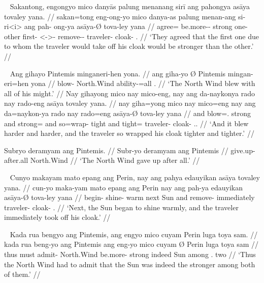 \ex~ %
\begingl
	\gla Sakantong, engongyo mico danyās palung menanang sirī ang pahongya
		asāya tovaley yana. //
	\glb sakan=tong eng-ong-yo mico danya-as palung menan-ang si-ri<i> ang pah-
		ong-ya asāya-Ø tova-ley yana //
	\glc agree=\TplN{} be.more-\Irr{}-\TsgN{} strong one-\Parg{} other
		first-\Aarg{} \Rel{}<-\Aarg{}>-\Caus{} \AgtT{}
		remove-\Irr{}-\TsgM{} traveler-\Top{} cloak-\PargI{}
		\TsgM{}.\Gen{} //
	\glft `They agreed that the first one due to whom the traveler would take
		off his cloak would be stronger than the other.' //
\endgl
\xe

\pex~ %
\a \begingl
	\gla Ang gihayo {} Pintemis minganeri-hen yona. //
	\glb ang giha-yo Ø Pintemis mingan-eri=hen yona //
	\glc \AgtT{} blow-\TsgN{} \Top{} North.Wind ability-\Ins{}=all
		\TsgN{}.\Gen{} //
	\glft `The North Wind blew with all of his might.' //
\endgl
\a \begingl
	\gla Nay gihayong mico nay mico-eng, nay ang da-naykonya rado nay rado-eng
		asāya tovaley yana. //
	\glb nay giha=yong mico nay mico=eng nay ang da=naykon-ya rado nay rado=eng
		asāya-Ø tova-ley yana //
	\glc and blow=\TsgN{}.\Aarg{} strong and strong=\Comp{} and \AgtT{}
		so=wrap-\TsgM{} tight and tight=\Comp{} traveler-\Top{}
		cloak-\PargI{} \TsgM{}.\Gen{}. //
	\glft `And it blew harder and harder, and the traveler so wrapped his cloak
		tighter and tighter.' //
\endgl

\a \begingl
	\gla Subryo deramyam ang Pintemis. //
	\glb Subr-yo deramyam ang Pintemis //
	\glc give.up-\TsgN{} {after.all} \Aarg{} North.Wind //
	\glft `The North Wind gave up after all.' //
\endgl
\xe

\ex~ %
\begingl
	\gla Cunyo makayam mato epang ang Perin, nay ang pahya edauyikan asāya
		tovaley yana. //
	\glb cun-yo maka-yam mato epang ang Perin nay ang pah-ya edauyikan asāya-Ø
		tova-ley yana //
	\glc begin-\TsgN{} shine-\Ptcp{} warm next \Aarg{} Sun and \AgtT{}
		remove-\TsgM{} immediately traveler-\Top{} cloak-\PargI{} 
		\TsgM{}.\Gen{} //
	\glft `Next, the Sun began to shine warmly, and the traveler immediately
		took off his cloak.' //
\endgl
\xe

\ex~ %
\begingl
	\gla Kada rua bengyo ang Pintemis, ang engyo mico cuyam {} Perin luga toya
		sam. //
	\glb kada rua beng-yo ang Pintemis ang eng-yo mico cuyam Ø Perin luga toya
		sam //
	\glc thus must admit-\Tsg{} \Aarg{} North.Wind \AgtT{} be.more-\TsgN{}
		strong indeed \Top{} Sun among \TplN{}.\Loc{} two //
	\glft `Thus the North Wind had to admit that the Sun was indeed the
		stronger among both of them.' //
\endgl
\xe

